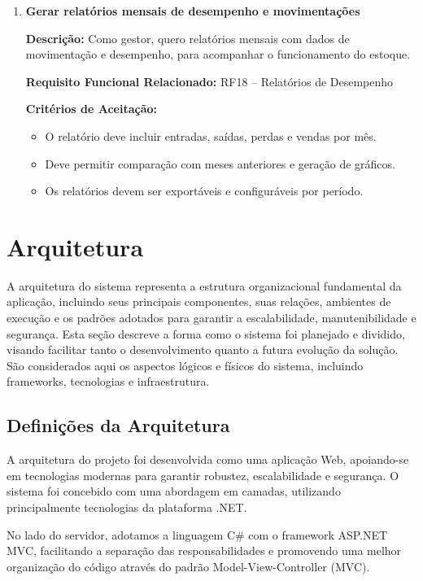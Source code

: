 \documentclass[
	12pt,				%
	openany,			%
	twoside,			%
	a4paper,			%
	english,			%
	brazil				%
	]{abntex2}
\begin{document}
\begin{enumerate}
\item \textbf{Gerar relatórios mensais de desempenho e movimentações}

\textbf{Descrição:} Como gestor, quero relatórios mensais com dados de movimentação e desempenho, para acompanhar o funcionamento do estoque.

\textbf{Requisito Funcional Relacionado:} RF18 -- Relatórios de Desempenho

\textbf{Critérios de Aceitação:}
\begin{itemize}
  \item O relatório deve incluir entradas, saídas, perdas e vendas por mês.
  \item Deve permitir comparação com meses anteriores e geração de gráficos.
  \item Os relatórios devem ser exportáveis e configuráveis por período.
\end{itemize}

\end{enumerate}
\section{Arquitetura}

A arquitetura do sistema representa a estrutura organizacional fundamental da aplicação, incluindo seus principais componentes, suas relações, ambientes de execução e os padrões adotados para garantir a escalabilidade, manutenibilidade e segurança. Esta seção descreve a forma como o sistema foi planejado e dividido, visando facilitar tanto o desenvolvimento quanto a futura evolução da solução. São considerados aqui os aspectos lógicos e físicos do sistema, incluindo frameworks, tecnologias e infraestrutura.


\subsection{Definições da Arquitetura}

A arquitetura do projeto foi desenvolvida como uma aplicação Web, apoiando-se em tecnologias modernas para garantir robustez, escalabilidade e segurança. O sistema foi concebido com uma abordagem em camadas, utilizando principalmente tecnologias da plataforma .NET.

No lado do servidor, adotamos a linguagem C\# com o framework ASP.NET MVC, facilitando a separação das responsabilidades e promovendo uma melhor organização do código através do padrão Model-View-Controller (MVC).
\end{document}
